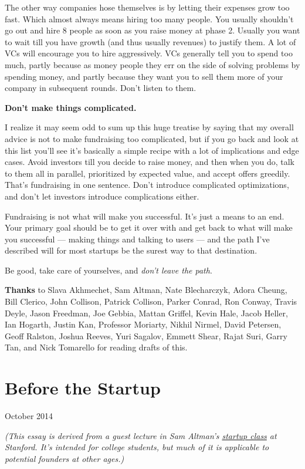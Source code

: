 \documentclass[12pt]{book}
\begin{document}
The other way companies hose themselves is by letting their expenses
grow too fast. Which almost always means hiring too many people. You
usually shouldn't go out and hire 8 people as soon as you raise money at
phase 2. Usually you want to wait till you have growth (and thus usually
revenues) to justify them. A lot of VCs will encourage you to hire
aggressively. VCs generally tell you to spend too much, partly because
as money people they err on the side of solving problems by spending
money, and partly because they want you to sell them more of your
company in subsequent rounds. Don't listen to them.

\textbf{Don't make things complicated.}

I realize it may seem odd to sum up this huge treatise by saying that my
overall advice is not to make fundraising too complicated, but if you go
back and look at this list you'll see it's basically a simple recipe
with a lot of implications and edge cases. Avoid investors till you
decide to raise money, and then when you do, talk to them all in
parallel, prioritized by expected value, and accept offers greedily.
That's fundraising in one sentence. Don't introduce complicated
optimizations, and don't let investors introduce complications either.

Fundraising is not what will make you successful. It's just a means to
an end. Your primary goal should be to get it over with and get back to
what will make you successful --- making things and talking to users ---
and the path I've described will for most startups be the surest way to
that destination.

Be good, take care of yourselves, and \emph{don't leave the path}.


\textbf{Thanks} to Slava Akhmechet, Sam Altman, Nate Blecharczyk, Adora
Cheung, Bill Clerico, John Collison, Patrick Collison, Parker Conrad,
Ron Conway, Travis Deyle, Jason Freedman, Joe Gebbia, Mattan Griffel,
Kevin Hale, Jacob Heller, Ian Hogarth, Justin Kan, Professor Moriarty,
Nikhil Nirmel, David Petersen, Geoff Ralston, Joshua Reeves, Yuri
Sagalov, Emmett Shear, Rajat Suri, Garry Tan, and Nick Tomarello for
reading drafts of this.
\chapter{Before the Startup}

October 2014

\emph{(This essay is derived from a guest lecture in Sam Altman's
\href{http://startupclass.samaltman.com/}{startup class} at Stanford.
It's intended for college students, but much of it is applicable to
potential founders at other ages.)}
\end{document}
